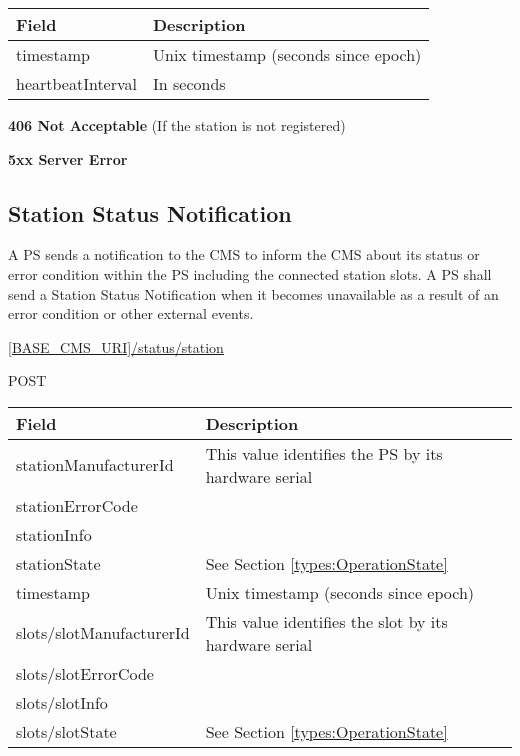 \begin{tabularx}{\linewidth}{ | l | X | }
  \hline
  \rowcolor{table-head}
  Field & Description \\
  \hline
  timestamp & Unix timestamp (seconds since epoch) \\
  heartbeatInterval & In seconds \\
    \hline
\end{tabularx}

\textbf{406 Not Acceptable} (If the station is not registered)

\textbf{5xx Server Error}

\subsection{Station Status Notification}

A \acs{PS} sends a notification to the \acs{CMS} to inform the \acs{CMS} about its status or error condition within the \acs{PS} including the connected station slots. A \acs{PS} shall send a Station Status Notification when it becomes unavailable as a result of an error condition or other external events.

 \url{[BASE_CMS_URI]/status/station}

 POST

\newpage
{}
\begin{table}[!h]
\vspace{-7mm}
\begin{tabularx}{\linewidth}{ | l | X | }
  \hline
  \rowcolor{table-head}
  Field & Description \\
  \hline
  stationManufacturerId 		& This value identifies the \acs{PS} by its hardware serial\\
  stationErrorCode & \\
  stationInfo & \\
  stationState & See Section \ref{types:OperationState} \\
  timestamp & Unix timestamp (seconds since epoch) \\
  slots/slotManufacturerId 	& This value identifies the slot by its hardware serial \\
  slots/slotErrorCode & \\
  slots/slotInfo & \\
  slots/slotState & See Section \ref{types:OperationState} \\
  \hline
\end{tabularx}
\end{table}

